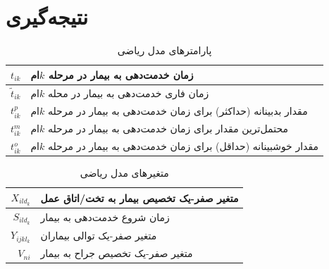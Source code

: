 \section{نتیجه‌گیری}




	\begin{table}[ht]
	\caption{پارامترهای مدل ریاضی}
	\label{tab:modelParameters}
	\centering
	\onehalfspacing
	\begin{tabularx}{0.9\textwidth}{|r|X|}
		\hline
		$t_{ik}$			& زمان خدمت‌دهی به بیمار در مرحله $k$ام \\
		\hline
		$\tilde{t}_{ik}$	& زمان فاری خدمت‌دهی به بیمار در محله $k$ام \\
		\hline
		$t_{ik}^p$			& مقدار بدبینانه (حداکثر) برای زمان خدمت‌دهی به بیمار در مرحله $k$ام \\
		\hline
		$t_{ik}^m$			& محتمل‌ترین مقدار برای زمان خدمت‌دهی به بیمار در مرحله $k$ام \\
		\hline
		$t_{ik}^o$			& مقدار خوشبینانه (حداقل) برای زمان خدمت‌دهی به بیمار در مرحله $k$ام \\
		\hline
	\end{tabularx}
\end{table}

\begin{table}[ht]
	\caption{متغیرهای مدل ریاضی}
	\label{tab:modelVariables}
	\centering
	\onehalfspacing
	\begin{tabularx}{0.9\textwidth}{|r|X|}
		\hline
		$X_{ild_{k}}$	& متغیر صفر-یک تخصیص بیمار به تخت/اتاق عمل\\
		\hline
		$S_{ild_{k}}$	& زمان شروع خدمت‌دهی به بیمار \\
		\hline
		$Y_{ijkl_{k}}$	& متغیر صفر-یک توالی بیماران \\
		\hline
		$V_{ni}$		& متغیر صفر-یک تخصیص جراح به بیمار‍‍ \\
		\hline
	\end{tabularx}
\end{table}

